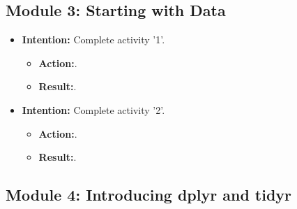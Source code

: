 \documentclass{article}
\begin{document}
\subsection{Module 3: Starting with Data}

\begin{itemize}
 
\item{\textbf{Intention:} Complete activity '1'.}

\begin{itemize}
\item{\textbf{Action:}.}
\item{\textbf{Result:}.}
\end{itemize}


\item{\textbf{Intention:} Complete activity '2'.}

\begin{itemize}
\item{\textbf{Action:}.}
\item{\textbf{Result:}.}
\end{itemize}


\end{itemize}




\subsection{Module 4: Introducing dplyr and tidyr}
\end{document}
